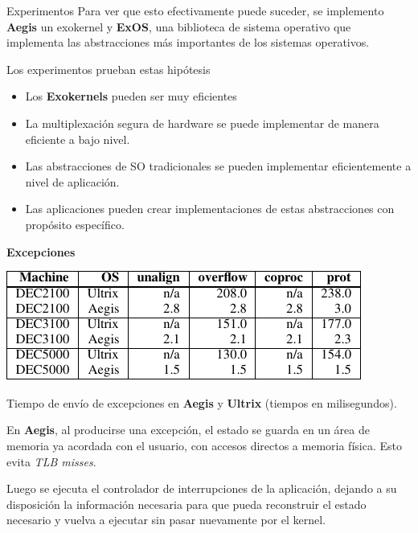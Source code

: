 \documentclass[10pt]{beamer}
\begin{document}
\begin{frame}{Experimentos}
Para ver que esto efectivamente puede suceder, se implemento \textbf{Aegis} un exokernel y \textbf{ExOS}, una biblioteca de sistema operativo que implementa las abstracciones más importantes de los sistemas operativos. 

Los experimentos prueban estas hipótesis

\begin{itemize}
  \item Los \textbf{Exokernels} pueden ser muy eficientes
  \item La multiplexación segura de hardware se puede implementar de manera eficiente a bajo nivel.
  \item Las abstracciones de SO tradicionales se pueden implementar eficientemente a nivel de aplicación.
  \item Las aplicaciones pueden crear implementaciones de estas abstracciones con propósito específico.
\end{itemize}
\end{frame}

\begin{frame}
\textbf{Excepciones}\\[2em]
\begin{table}
\includegraphics[scale=0.8]{grafico-excepciones.pdf}
\caption{Tiempo de envío de excepciones en \textbf{Aegis} y \textbf{Ultrix} (tiempos en milisegundos).}
\end{table}

En \textbf{Aegis}, al producirse una excepción, el estado se guarda en un área de memoria ya acordada con el usuario, con accesos directos a memoria física. Esto evita \emph{TLB misses}.

Luego se ejecuta el controlador de interrupciones de la aplicación, dejando a su disposición la información necesaria para que pueda reconstruir el estado necesario y vuelva a ejecutar sin pasar nuevamente por el kernel. 
\end{frame}

\end{document}
